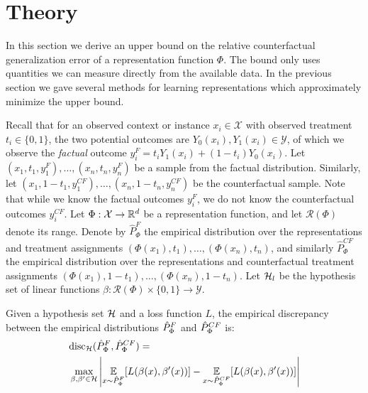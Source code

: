 \section{Theory}\label{Sec:theory}

In this section we derive an upper bound on the relative counterfactual generalization error of a representation function $\Phi$. The bound only uses quantities we can measure directly from the available data. In the previous section we gave several methods for learning representations which approximately minimize the upper bound.

Recall that for an observed context or instance $x_i \in \mathcal{X}$ with observed treatment $t_i \in \{0,1\}$, the two potential outcomes are $Y_0(x_i), Y_1(x_i) \in \mathcal{Y}$, of which we observe the \emph{factual} outcome $y^F_i = t_i Y_1(x_i) + (1-t_i)Y_0(x_i)$.
Let $ (x_1, t_1, y^F_1), \ldots, (x_n, t_n, y^F_n)$ be a sample from the factual distribution.
Similarly, let $(x_1, 1-t_1, y^{CF}_1), \ldots, (x_n, 1-t_n, y^{CF}_n)$  be the counterfactual sample. Note that while we know the factual outcomes $y^F_i$, we do not know the counterfactual outcomes $y^{CF}_i$.
Let $\Phi : \mathcal{X} \rightarrow \mathbb{R}^d$ be a representation function, and let $\mathcal{R}(\Phi)$ denote its range.
Denote by $\hat{P}_\Phi^F$ the empirical distribution over the representations and treatment assignments $ (\Phi(x_1), t_1),  \ldots, (\Phi(x_n), t_n)$, and similarly $\hat{P}_\Phi^{CF}$ the empirical distribution over the representations and counterfactual treatment assignments $ (\Phi(x_1), 1-t_1),  \ldots, (\Phi(x_n), 1-t_n)$.
Let $\mathcal{H}_l$ be the hypothesis set of linear functions $\beta : \mathcal{R}(\Phi) \times \{0,1\} \rightarrow \mathcal{Y}$.

\begin{definition}
Given a hypothesis set $\mathcal{H}$ and a loss function $L$, the empirical discrepancy between
the empirical distributions $\hat{P}_\Phi^{F}$ and $\hat{P}_\Phi^{CF}$ is:
\begin{align*}
&\text{disc}_{\mathcal{H}}(\hat{P}_\Phi^{F},\hat{P}_\Phi^{CF}) = \\
&\max_{\beta, \beta' \in \mathcal{H}} \left| \underset{x \sim \hat{P}_\Phi^{F}}{\mathbb{E}}[L(\beta(x),\beta'(x))] - \underset{x \sim \hat{P}_\Phi^{CF}}{\mathbb{E}}[L(\beta(x),\beta'(x))]\right|
\end{align*}
\end{definition}

